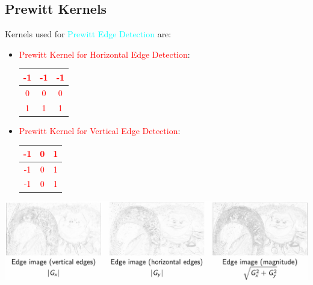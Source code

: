 \documentclass{book}
\begin{document}
\subsection{Prewitt Kernels}
Kernels used for \textcolor{cyan}{Prewitt Edge Detection} are:
\begin{itemize}
    \item \textcolor{red}{Prewitt Kernel for Horizontal Edge Detection}:
    \begin{center}
        \textcolor{red}{
        \begin{tabular}{|c|c|c|}
            \hline
            -1 & -1 & -1 \\
            \hline
            0 & 0 & 0 \\
            \hline
            1 & 1 & 1 \\
            \hline
        \end{tabular}}
    \end{center}
    \item \textcolor{red}{Prewitt Kernel for Vertical Edge Detection}:
    \begin{center}
        \textcolor{red}{
        \begin{tabular}{|c|c|c|}
            \hline
            -1 & 0 & 1 \\
            \hline
            -1 & 0 & 1 \\
            \hline
            -1 & 0 & 1 \\
            \hline
        \end{tabular}}
    \end{center}
\end{itemize}
\begin{center}
    \includegraphics[scale=0.3]{chapter 8/prewitt_kernel.jpeg}
\end{center}
\end{document}
